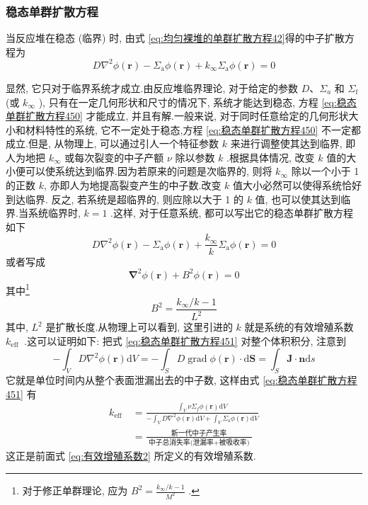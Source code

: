 \documentclass{Sichuan Normal University}
\begin{document}
\subsubsection{稳态单群扩散方程}
当反应堆在稳态 (临界) 时, 由式 \eqref{eq:均匀裸堆的单群扩散方程42}得的中子扩散方程为
\begin{equation}
D \nabla^2 \phi(\boldsymbol{r})-\Sigma_{\mathrm{a}} \phi(\boldsymbol{r})+k_{\infty} \Sigma_{\mathrm{a}} \phi(\boldsymbol{r})=0
\label{eq:稳态单群扩散方程450}
\end{equation}

显然, 它只对于临界系统才成立.由反应堆临界理论, 对于给定的参数 $D 、 \Sigma_{a}$ 和 $\Sigma_{\mathrm{f}}$ (或 $k_{\infty}$ ), 只有在一定几何形状和尺寸的情况下, 系统才能达到稳态, 方程 \eqref{eq:稳态单群扩散方程450} 才能成立, 并且有解.一般来说, 对于同时任意给定的几何形状大小和材料特性的系统, 它不一定处于稳态,方程 \eqref{eq:稳态单群扩散方程450} 不一定都成立.但是, 从物理上, 可以通过引人一个特征参数 $k$ 来进行调整使其达到临界, 即人为地把 $k_{\infty}$ 或每次裂变的中子产额 $\nu$ 除以参数 $k$ .根据具体情况, 改变 $k$ 值的大小便可以使系统达到临界.因为若原来的问题是次临界的, 则将 $k_{\infty}$ 除以一个小于 1 的正数 $k$, 亦即人为地提高裂变产生的中子数.改变 $k$ 值大小必然可以使得系统恰好到达临界.
反之, 若系统是超临界的, 则应除以大于 1 的 $k$ 值, 也可以使其达到临界.当系统临界时, $k=1$ .这样, 对于任意系统, 都可以写出它的稳态单群扩散方程如下
\begin{equation}
D \nabla^2 \phi(\boldsymbol{r})-\Sigma_{\mathrm{a}} \phi(\boldsymbol{r})+\frac{k_{\infty}}{k} \Sigma_{\mathrm{a}} \phi(\boldsymbol{r})=0
\label{eq:稳态单群扩散方程451}
\end{equation}
或者写成
\begin{equation}
\boldsymbol{\nabla}^2 \phi(\boldsymbol{r})+B^2 \phi(\boldsymbol{r})=0
\end{equation}其中\footnote{对于修正单群理论, 应为 $B^2=\frac{k_{\infty} / k-1}{M^2}$ .}
\begin{equation}
B^2=\frac{k_{\infty} / k-1}{L^2}
\end{equation}
其中, $L^2$ 是扩散长度.从物理上可以看到, 这里引进的 $k$ 就是系统的有效增殖系数 $k_{\text {eff }}$ .这可以证明如下: 把式 \eqref{eq:稳态单群扩散方程451} 对整个体积积分, 注意到
\begin{equation}
-\int_V D \nabla^2 \phi(\boldsymbol{r}) \mathrm{d} V=-\int_S D \operatorname{grad} \phi(\boldsymbol{r}) \cdot \mathrm{d} \boldsymbol{S}=\int_S \boldsymbol{J} \cdot \boldsymbol{n} \mathrm{d} s
\end{equation}
它就是单位时间内从整个表面泄漏出去的中子数, 这样由式 \eqref{eq:稳态单群扩散方程451} 有
\begin{equation}
\begin{aligned}
k_{\text {eff }} & =\frac{\int_V \nu \Sigma_f \phi(\boldsymbol{r}) \mathrm{d} V}{-\int_V D \nabla^2 \phi(\boldsymbol{r}) \mathrm{d} V+\int_V \Sigma_{\mathrm{a}} \phi(\boldsymbol{r}) \mathrm{d} V} \\
& =\frac{\text { 新一代中子产生率 }}{\text { 中子总消失率(泄漏率+被吸收率) }}
\end{aligned}
\end{equation}
这正是前面式 \eqref{eq:有效增殖系数2} 所定义的有效增殖系数.
\end{document}
